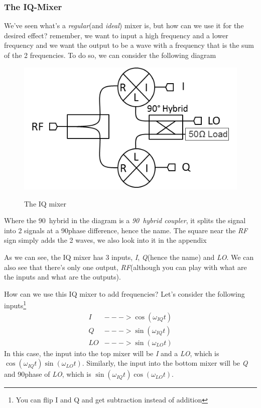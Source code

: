 \documentclass[english, a4paper, 12pt, twoside]{article}
\numberwithin{equation}{section} %
\begin{document}
\subsubsection{The IQ-Mixer}
We've seen what's a \textit{regular}(and \textit{ideal}) mixer is, but how can we use it for the desired effect? remember, we want to input a high frequency and a lower frequency and we want the output to be a wave with a frequency that is the sum of the 2 frequencies. To do so, we can consider the following diagram
\begin{figure}[H]
    \centering
    \caption{The IQ mixer}
    \includegraphics[width=0.5\columnwidth]{IQ-Mixer.png} %
    \label{fig:IQ-Mixer}
\end{figure}
Where the 90\degree\ hybrid in the diagram is a \textit{90\degree\  hybrid coupler}, it splits the signal into 2 signals at a 90\degree phase difference, hence the name. The square near the \textit{RF} sign simply adds the 2 waves, we also look into it in the appendix %

As we can see, the IQ mixer has 3 inputs, \textit{I}, \textit{Q}(hence the name) and \textit{LO}. We can also see that there's only one output, \textit{RF}(although you can play with what are the inputs and what are the outputs).

How can we use this IQ mixer to add frequencies? Let's consider the following inputs\footnote{You can flip I and Q and get subtraction instead of addition}
\begin{align*}
    I &---> \cos(\omega_{IQ} t)\\
    Q &---> \sin(\omega_{IQ} t)\\
    LO &---> \sin(\omega_{LO}t)
\end{align*}
In this case, the input into the top mixer will be \textit{I} and a \textit{LO}, which is $\cos(\omega_{IQ}t)\sin(\omega_{LO}t)$. Similarly, the input into the bottom mixer will be \textit{Q} and 90\degree phase of \textit{LO}, which is $\sin(\omega_{IQ}t)\cos(\omega_{LO}t)$.
\end{document}
